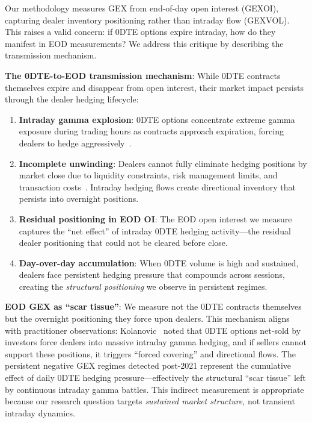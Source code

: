\vspace{0.2cm}

Our methodology measures GEX from end-of-day open interest (GEX\textunderscore OI), capturing dealer inventory positioning rather than intraday flow (GEX\textunderscore VOL). This raises a valid concern: if 0DTE options expire intraday, how do they manifest in EOD measurements? We address this critique by describing the transmission mechanism.

\vspace{0.2cm}

\noindent\textbf{The 0DTE-to-EOD transmission mechanism}: While 0DTE contracts themselves expire and disappear from open interest, their market impact persists through the dealer hedging lifecycle:

\vspace{0.1cm}

\begin{enumerate}
\item \textbf{Intraday gamma explosion}: 0DTE options concentrate extreme gamma exposure during trading hours as contracts approach expiration, forcing dealers to hedge aggressively~\citep{dim2025zero}.

\item \textbf{Incomplete unwinding}: Dealers cannot fully eliminate hedging positions by market close due to liquidity constraints, risk management limits, and transaction costs~\citep{garleanu2013dynamic}. Intraday hedging flows create directional inventory that persists into overnight positions.

\item \textbf{Residual positioning in EOD OI}: The EOD open interest we measure captures the ``net effect'' of intraday 0DTE hedging activity—the residual dealer positioning that could not be cleared before close.

\item \textbf{Day-over-day accumulation}: When 0DTE volume is high and sustained, dealers face persistent hedging pressure that compounds across sessions, creating the \textit{structural positioning} we observe in persistent regimes.
\end{enumerate}

\vspace{0.2cm}

\noindent\textbf{EOD GEX as ``scar tissue''}: We measure not the 0DTE contracts themselves but the overnight positioning they force upon dealers. This mechanism aligns with practitioner observations: Kolanovic~\citep{kolanovic2023volmageddon} noted that 0DTE options net-sold by investors force dealers into massive intraday gamma hedging, and if sellers cannot support these positions, it triggers ``forced covering'' and directional flows. The persistent negative GEX regimes detected post-2021 represent the cumulative effect of daily 0DTE hedging pressure—effectively the structural ``scar tissue'' left by continuous intraday gamma battles. This indirect measurement is appropriate because our research question targets \textit{sustained market structure}, not transient intraday dynamics.

